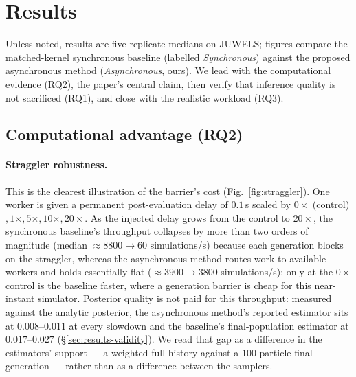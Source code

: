\section{Results}\label{sec:results}
Unless noted, results are five-replicate medians on JUWELS; figures compare the matched-kernel synchronous baseline (labelled \emph{Synchronous}) against the proposed asynchronous method (\emph{Asynchronous}, ours). We lead with the computational evidence (RQ2), the paper's central claim, then verify that inference quality is not sacrificed (RQ1), and close with the realistic workload (RQ3).

\subsection{Computational advantage (RQ2)}\label{sec:results-hpc}
\paragraph{Straggler robustness.} This is the clearest illustration of the barrier's cost (Fig.~\ref{fig:straggler}). One worker is given a permanent post-evaluation delay of $0.1$\,s scaled by $0\times$ (control)$,1\times,5\times,10\times,20\times$. As the injected delay grows from the control to $20\times$, the synchronous baseline's throughput collapses by more than two orders of magnitude (median $\approx 8800 \to 60$ simulations/s) because each generation blocks on the straggler, whereas the asynchronous method routes work to available workers and holds essentially flat ($\approx 3900 \to 3800$ simulations/s); only at the $0\times$ control is the baseline faster, where a generation barrier is cheap for this near-instant simulator. Posterior quality is not paid for this throughput: measured against the analytic posterior, the asynchronous method's reported estimator sits at $0.008$--$0.011$ at every slowdown and the baseline's final-population estimator at $0.017$--$0.027$ (\S\ref{sec:results-validity}). We read that gap as a difference in the estimators' support --- a weighted full history against a $100$-particle final generation --- rather than as a difference between the samplers.

